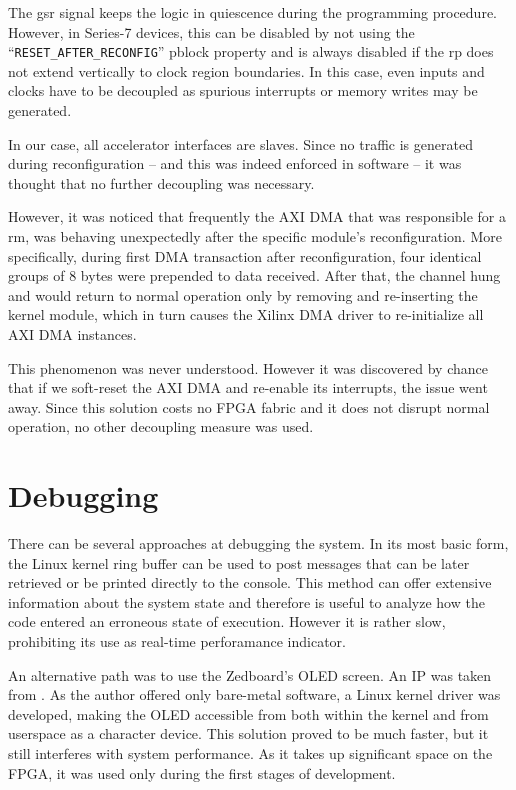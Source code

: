 The \gls{gsr} signal keeps the logic in quiescence during the programming procedure.
However, in Series-7 devices, this can be disabled by not using the ``\texttt{RESET\_AFTER\_RECONFIG}''
\gls{pblock} property and is always disabled if the \gls{rp}
does not extend vertically to clock region boundaries.
In this case, even inputs and clocks have to be decoupled as spurious interrupts or memory writes
may be generated.

In our case, all accelerator interfaces are slaves.
Since no traffic is generated during reconfiguration
-- and this was indeed enforced in software --
it was thought that no further decoupling was necessary.

However, it was noticed that frequently the AXI DMA that was responsible for
a \gls{rm}, was behaving unexpectedly after the specific module's reconfiguration.
More specifically, during first DMA transaction after reconfiguration, four identical
groups of 8 bytes were prepended to data received. After that, the channel hung
and would return to normal operation only by removing and re-inserting the kernel module,
which in turn causes the Xilinx DMA driver to re-initialize all AXI DMA instances.

This phenomenon was never understood. However it was discovered by chance that
if we soft-reset the AXI DMA and re-enable its interrupts, the issue went away.
Since this solution costs no FPGA fabric and it does not disrupt normal operation,
no other decoupling measure was used.

\section{Debugging}

There can be several approaches at debugging the system. In its most basic form,
the Linux kernel ring buffer can be used to post messages that can be later retrieved
or be printed directly to the console. This method can offer extensive information
about the system state and therefore is useful to analyze how the code entered an
erroneous state of execution. However it is rather slow, prohibiting its use as
real-time perforamance indicator.

An alternative path was to use the Zedboard's OLED screen. An IP was taken from \cite{zedboard-oled}.
As the author offered only bare-metal software, a Linux kernel driver was developed,
making the OLED accessible from both within the kernel and from userspace as a character device.
This solution proved to be much faster, but it still interferes with system performance.
As it takes up significant space on the FPGA, it was used only during the first stages of development.

